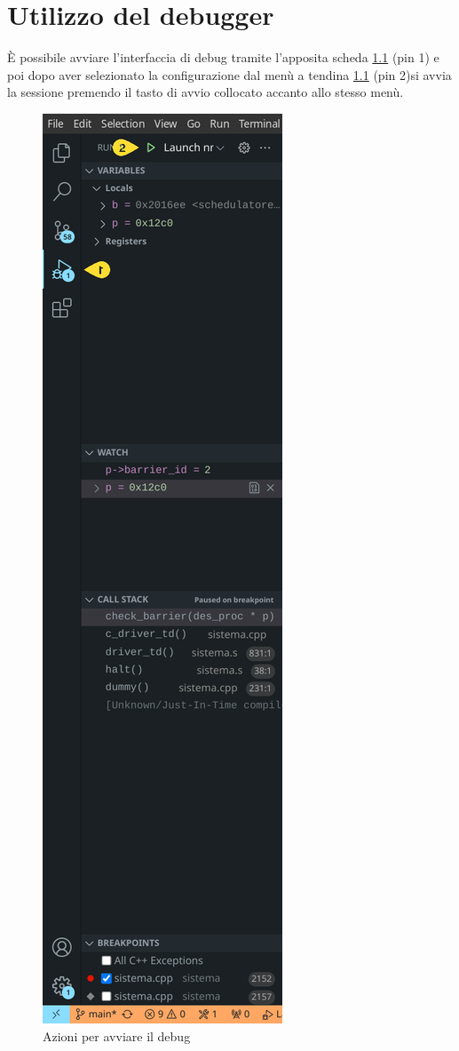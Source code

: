 \chapter{Utilizzo del debugger}
È possibile avviare l'interfaccia di debug tramite l'apposita scheda \ref{fig:startDebug} (pin 1) e poi dopo aver selezionato la configurazione   dal menù a tendina \ref{fig:startDebug} (pin 2)si avvia la sessione premendo il tasto di avvio collocato accanto allo stesso menù.  

\begin{figure}[H]
    \centering
    \includegraphics[height=0.3\pdfpageheight]{images/startDebug.png}
    \caption{Azioni per avviare il debug}
    \label{fig:startDebug}
\end{figure}

